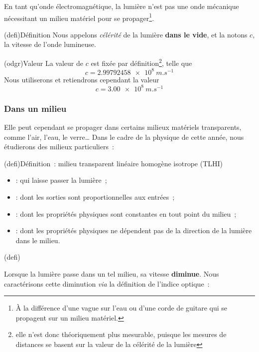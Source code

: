 \documentclass[../../main/main.tex]{subfiles}
\begin{document}
En tant qu'onde électromagnétique, la lumière n'est pas une onde mécanique
nécessitant un milieu matériel pour se propager\footnote{À la différence d'une
	vague sur l'eau ou d'une corde de guitare qui se propagent sur un milieu
	matériel.}.
\begin{tcb}(defi){Définition}
	Nous appelons \textit{célérité} de la lumière \textbf{dans le vide}, et
	la notons $c$, la vitesse de l'onde lumineuse.
\end{tcb}
\begin{tcb}(odgr){Valeur}
	La valeur de $c$ est fixée par définition\footnote{elle n'est donc
		théoriquement plus mesurable, puisque les mesures de distances se
		basent sur la valeur de la célérité de la lumière}, telle que
	\[c = \SI{2.99792458e8}{m.s^{-1}}\]
	Nous utiliserons et retiendrons cependant la valeur
	\[\boxed{c = \SI{3.00e8}{m.s^{-1}}}\]
\end{tcb}

\subsubsection{Dans un milieu}

Elle peut cependant se propager dans certains milieux matériels transparents,
comme l'air, l'eau, le verre… Dans le cadre de la physique de cette année, nous
étudierons des milieux particuliers~:

\vfill

\begin{tcb}(defi){Définition~: milieu transparent linéaire homogène isotrope (TLHI)}
	\begin{itemize}[leftmargin=66pt]
		\item[\textbf{Transparent}] : qui laisse passer la lumière~;
		\item[\textbf{Linéaire}] : dont les sorties sont proportionnelles aux
			entrées~;
		\item[\textbf{Homogène}] : dont les propriétés physiques sont
			constantes en tout point du milieu~;
		\item[\textbf{Isotrope}] : dont les propriétés physiques ne
			dépendent pas de la direction de la lumière dans le milieu.
	\end{itemize}
\end{tcb}(defi)

Lorsque la lumière passe dans un tel milieu, sa vitesse \textbf{diminue}. Nous
caractérisons cette diminution \textit{via} la définition de l'indice optique~:
\end{document}
